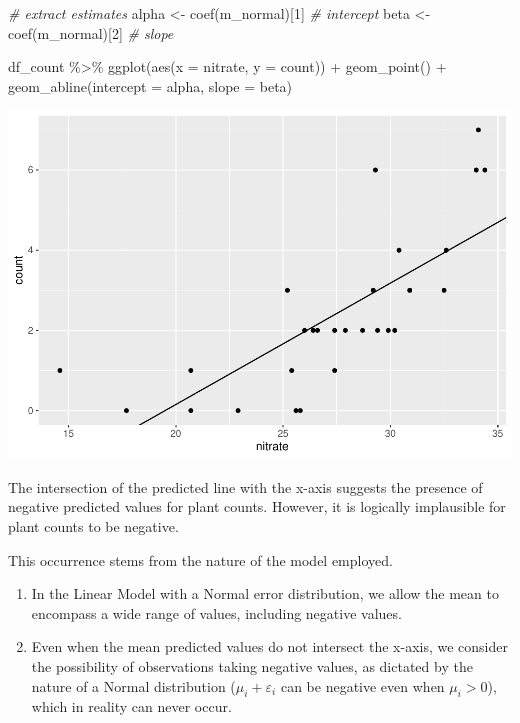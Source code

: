 \documentclass[
]{book}
\newenvironment{Shaded}{\begin{snugshade}}{\end{snugshade}}
\newcommand{\AttributeTok}[1]{\textcolor[rgb]{0.77,0.63,0.00}{#1}}
\newcommand{\CommentTok}[1]{\textcolor[rgb]{0.56,0.35,0.01}{\textit{#1}}}
\newcommand{\DecValTok}[1]{\textcolor[rgb]{0.00,0.00,0.81}{#1}}
\newcommand{\FunctionTok}[1]{\textcolor[rgb]{0.00,0.00,0.00}{#1}}
\newcommand{\NormalTok}[1]{#1}
\newcommand{\OtherTok}[1]{\textcolor[rgb]{0.56,0.35,0.01}{#1}}
\newcommand{\SpecialCharTok}[1]{\textcolor[rgb]{0.00,0.00,0.00}{#1}}
\providecommand{\tightlist}{%
  \setlength{\itemsep}{0pt}\setlength{\parskip}{0pt}}
\begin{document}
\begin{Shaded}
\begin{Highlighting}[]
\CommentTok{\# extract estimates}
\NormalTok{alpha }\OtherTok{\textless{}{-}} \FunctionTok{coef}\NormalTok{(m\_normal)[}\DecValTok{1}\NormalTok{] }\CommentTok{\# intercept}
\NormalTok{beta }\OtherTok{\textless{}{-}} \FunctionTok{coef}\NormalTok{(m\_normal)[}\DecValTok{2}\NormalTok{] }\CommentTok{\# slope}

\NormalTok{df\_count }\SpecialCharTok{\%\textgreater{}\%} 
  \FunctionTok{ggplot}\NormalTok{(}\FunctionTok{aes}\NormalTok{(}\AttributeTok{x =}\NormalTok{ nitrate,}
             \AttributeTok{y =}\NormalTok{ count)) }\SpecialCharTok{+}
  \FunctionTok{geom\_point}\NormalTok{() }\SpecialCharTok{+}
  \FunctionTok{geom\_abline}\NormalTok{(}\AttributeTok{intercept =}\NormalTok{ alpha,}
              \AttributeTok{slope =}\NormalTok{ beta)}
\end{Highlighting}
\end{Shaded}

\begin{center}\includegraphics{biostats_files/figure-latex/unnamed-chunk-59-1} \end{center}

The intersection of the predicted line with the x-axis suggests the presence of negative predicted values for plant counts. However, it is logically implausible for plant counts to be negative.

This occurrence stems from the nature of the model employed.

\begin{enumerate}
\def\labelenumi{\arabic{enumi}.}
\tightlist
\item
  In the Linear Model with a Normal error distribution, we allow the mean to encompass a wide range of values, including negative values.
\item
  Even when the mean predicted values do not intersect the x-axis, we consider the possibility of observations taking negative values, as dictated by the nature of a Normal distribution (\(\mu_i + \varepsilon_i\) can be negative even when \(\mu_i > 0\)), which in reality can never occur.
\end{enumerate}
\end{document}
